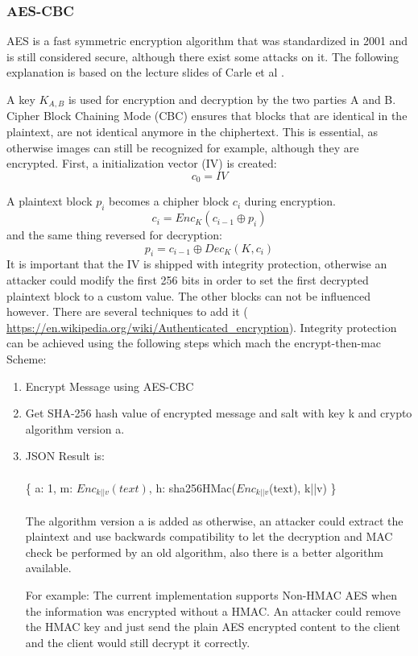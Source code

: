 \documentclass{scrartcl}
\begin{document}
\subsubsection{AES-CBC \label{AESCBC}}
AES is a fast symmetric encryption algorithm that was standardized in 2001 and is still considered secure, although there exist some attacks on it. The following explanation is based on the lecture slides of Carle et al \cite{carle}.

A key $K_{A,B}$ is used for encryption and decryption by the two parties A and B. 
Cipher Block Chaining Mode (CBC) ensures that blocks that are identical in the plaintext, are not identical anymore in the chiphertext. This is essential, as otherwise images can still be recognized for example, although they are encrypted. First, a initialization vector (IV) is created:
$$
c_0 = IV
$$

A plaintext block $p_i$ becomes a chipher block $c_i$ during encryption.
$$
c_i = Enc_K(c_{i-1} \oplus p_i)
$$
and the same thing reversed for decryption:
$$
p_i = c_{i-1} \oplus Dec_K(K, c_i)
$$
It is important that the IV is shipped with integrity protection, otherwise an attacker could modify the first 256 bits in order to set the first decrypted plaintext block to a custom value. The other blocks can not be influenced however. 
There are several techniques to add it (
\url{https://en.wikipedia.org/wiki/Authenticated_encryption}).
 Integrity protection can be achieved using the following steps which mach the encrypt-then-mac Scheme:
\begin{enumerate}
\item Encrypt Message using AES-CBC
\item Get SHA-256 hash value of encrypted message and salt with key k and crypto algorithm version a.
\item JSON Result is:\\\\ \{ a: 1, m: $Enc_{k||v}(text)$, h: sha256HMac($Enc_{k||v}$(text), k||v) \}\\\\ The algorithm version a is added as otherwise, an attacker could extract the plaintext and use backwards compatibility to let the decryption and MAC check be performed by an old algorithm, also there is a better algorithm available.

For example: The current implementation supports Non-HMAC AES when the information was encrypted without a HMAC. An attacker could remove the HMAC key and just send the plain AES encrypted content to the client and the client would still decrypt it correctly.

\end{enumerate}
\end{document}
